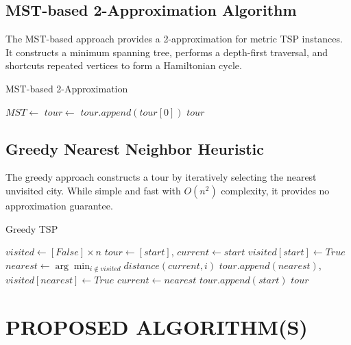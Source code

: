 \documentclass[sigconf]{acmart}
\begin{document}
\subsection{MST-based 2-Approximation Algorithm}

The MST-based approach provides a 2-approximation for metric TSP instances. It constructs a minimum spanning tree, performs a depth-first traversal, and shortcuts repeated vertices to form a Hamiltonian cycle.

\begin{algorithm}
\caption{MST-based 2-Approximation}
\begin{algorithmic}[1]
    \State $MST \leftarrow $  
    \State $tour \leftarrow $  
    \State $tour.append(tour[0])$ 
    \State \Return $tour$
\EndFunction
\end{algorithmic}
\end{algorithm}

\subsection{Greedy Nearest Neighbor Heuristic}

The greedy approach constructs a tour by iteratively selecting the nearest unvisited city. While simple and fast with $O(n^2)$ complexity, it provides no approximation guarantee.

\begin{algorithm}
\caption{Greedy TSP}
\begin{algorithmic}[1]
    \State $visited \leftarrow [False] \times n$
    \State $tour \leftarrow [start]$, $current \leftarrow start$
    \State $visited[start] \leftarrow True$
        \State $nearest \leftarrow \arg\min_{i \notin visited} distance(current, i)$
        \State $tour.append(nearest)$, $visited[nearest] \leftarrow True$
        \State $current \leftarrow nearest$
    \EndFor
    \State $tour.append(start)$
    \State \Return $tour$
\EndFunction
\end{algorithmic}
\end{algorithm}

\section{PROPOSED ALGORITHM(S)}
\end{document}

